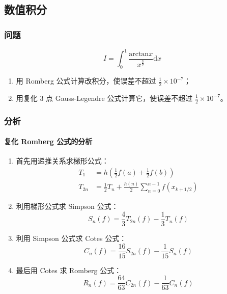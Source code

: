\chapter[第五章]{} %
\label{cha:chapter5}

\section*{数值积分}

\subsection{问题}

\begin{equation}
    I = \int_0^1 \frac{\mathrm{arctan}x}{x^{\frac{3}{2}}} \mathrm{d}x
\end{equation}



\begin{enumerate}[(1)]
    \item 用 Romberg 公式计算改积分，使误差不超过 $\frac{1}{2}\times 10^{-7}$；
    \item ⽤复化 3 点 Gauss-Legendre 公式计算它，使误差不超过 $\frac{1}{2}\times 10^{-7}$。
\end{enumerate}

\subsection{分析}

\subsubsection{复化 Romberg 公式的分析}

\begin{enumerate}[(1)]
    \item 首先用递推关系求梯形公式：
    \begin{align}
        T_1 &= h(\frac{1}{2}f(a)+\frac{1}{2}f(b)) \\
        T_{2n} &= \frac{1}{2}T_n + \frac{h(n)}{2}\sum\nolimits_{n=0}^{n-1}f(x_{k+1/2})
    \end{align}

    \item 利用梯形公式求 Simpson 公式：
    \begin{equation}
        S_n(f) = \frac{4}{3}T_{2n}(f) - \frac{1}{3}T_n(f)
    \end{equation}

    \item 利用 Simpson 公式求 Cotes 公式：
    \begin{equation}
        C_n(f) = \frac{16}{15}S_{2n}(f)-\frac{1}{15}S_n(f)
    \end{equation}

    \item 最后用 Cotes 求 Romberg 公式：
    \begin{equation}
        R_n(f) = \frac{64}{63}C_{2n}(f)-\frac{1}{63}C_n(f)
    \end{equation}
\end{enumerate}

